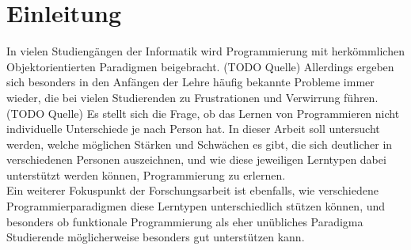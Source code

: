 \clearpage
\section{Einleitung}
\label{sec:intro}

In vielen Studiengängen der Informatik wird Programmierung mit herkömmlichen Objektorientierten Paradigmen beigebracht. (TODO Quelle) Allerdings ergeben sich besonders in den Anfängen der Lehre häufig bekannte Probleme immer wieder, die bei vielen Studierenden zu Frustrationen und Verwirrung führen. (TODO Quelle) Es stellt sich die Frage, ob das Lernen von Programmieren nicht individuelle Unterschiede je nach Person hat. In dieser Arbeit soll untersucht werden, welche möglichen Stärken und Schwächen es gibt, die sich deutlicher in verschiedenen Personen auszeichnen, und wie diese jeweiligen Lerntypen dabei unterstützt werden können, Programmierung zu erlernen.
\\
Ein weiterer Fokuspunkt der Forschungsarbeit ist ebenfalls, wie verschiedene Programmierparadigmen diese Lerntypen unterschiedlich stützen können, und besonders ob funktionale Programmierung als eher unübliches Paradigma Studierende möglicherweise besonders gut unterstützen kann.
